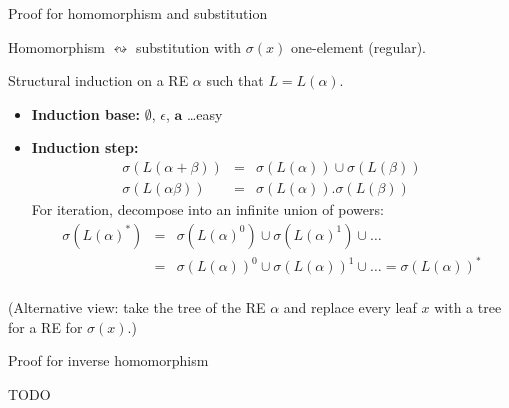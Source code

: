 \documentclass[handout]{beamer}
\begin{document}
        
\begin{frame}{Proof for homomorphism and substitution}

    Homomorphism $\leftrightsquigarrow$ substitution with $\sigma(x)$ one-element (regular).

    Structural induction on a RE $\alpha$ such that $L=L(\alpha)$. 
    
    \begin{itemize}
        \item \textbf{Induction base:} $\emptyset$, $\epsilon$, $\mathbf{a}$ 
        \dots easy
        \item \textbf{Induction step:}
        \begin{eqnarray*}
            \sigma(L(\alpha+\beta))&=&\sigma(L(\alpha))\cup \sigma(L(\beta))\\
            \sigma(L(\alpha \beta))&=&\sigma(L(\alpha)).\sigma(L(\beta))
        \end{eqnarray*}        
        For iteration, decompose into an infinite union of powers:
        \begin{eqnarray*}
            \sigma(L(\alpha)^*)&=&\sigma(L(\alpha)^0)\cup \sigma(L(\alpha)^1)\cup \ldots\\
            &=&\sigma(L(\alpha))^0\cup \sigma(L(\alpha))^1\cup \ldots=\sigma(L(\alpha))^*\\
            &
        \end{eqnarray*}
        
    \end{itemize}

    (Alternative view: take the tree of the RE $\alpha$ and replace every leaf $x$ with a tree for a RE for $\sigma(x)$.)\hfill\qedsymbol

\end{frame}


\begin{frame}{Proof for inverse homomorphism}

    TODO

\end{frame}
\end{document}
